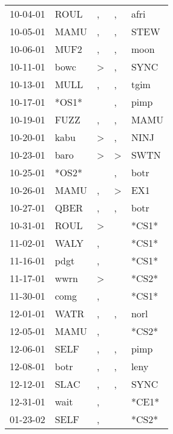\begin{supertabular}{lllll}
 10-04-01 &   ROUL &                , &                , &   afri \\
 10-05-01 &   MAMU &                , &                , &   STEW \\
 10-06-01 &   MUF2 &                , &                , &   moon \\
 10-11-01 &   bowc &     \textgreater &                , &   SYNC \\
 10-13-01 &   MULL &                , &                , &   tgim \\
 10-17-01 &  *OS1* &                  &                , &   pimp \\
 10-19-01 &   FUZZ &                , &                , &   MAMU \\
 10-20-01 &   kabu &     \textgreater &                , &   NINJ \\
 10-23-01 &   baro &     \textgreater &     \textgreater &   SWTN \\
 10-25-01 &  *OS2* &                  &                , &   botr \\
 10-26-01 &   MAMU &                , &     \textgreater &    EX1 \\
 10-27-01 &   QBER &                , &                , &   botr \\
 10-31-01 &   ROUL &     \textgreater &                  &  *CS1* \\
 11-02-01 &   WALY &                , &                  &  *CS1* \\
 11-16-01 &   pdgt &                , &                  &  *CS1* \\
 11-17-01 &   wwrn &     \textgreater &                  &  *CS2* \\
 11-30-01 &   comg &                , &                  &  *CS1* \\
 12-01-01 &   WATR &                , &                , &   norl \\
 12-05-01 &   MAMU &                , &                  &  *CS2* \\
 12-06-01 &   SELF &                , &                , &   pimp \\
 12-08-01 &   botr &                , &                , &   leny \\
 12-12-01 &   SLAC &                , &                , &   SYNC \\
 12-31-01 &   wait &                , &                  &  *CE1* \\
 01-23-02 &   SELF &                , &                  &  *CS2* \\

\end{supertabular}
